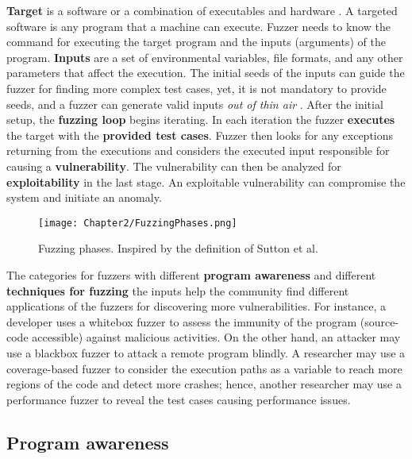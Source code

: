\textbf{Target} is a software or a combination of executables and hardware \cite{song2019periscope}. A targeted software is any program that a machine can execute. 
Fuzzer needs to know the command for executing the target program and the inputs (arguments) of the program. \textbf{Inputs} are a set of environmental variables, file formats, and any other parameters that affect the execution. The initial seeds of the inputs can guide the fuzzer for finding more complex test cases, yet, it is not mandatory to provide seeds, and a fuzzer can generate valid inputs \textit{out of thin air} \cite{out_of_thin_air}. After the initial setup, the \textbf{fuzzing loop} begins iterating. In each iteration the fuzzer \textbf{executes} the target with the \textbf{provided test cases}. Fuzzer then looks for any exceptions returning from the executions and considers the executed input responsible for causing a \textbf{vulnerability}. The vulnerability can then be analyzed for \textbf{exploitability} in the last stage. An exploitable vulnerability can compromise the system and initiate an anomaly.

\begin{figure}[!b]
  \texttt{[image: Chapter2/FuzzingPhases.png]}
  \centering
  \caption{Fuzzing phases. Inspired by the definition of Sutton et al. \cite{sutton2007fuzzing}}
  \label{fig:fuzz_phases}
\end{figure}

The categories for fuzzers with different \textbf{program awareness} and different \textbf{techniques for fuzzing} the inputs help the community find different applications of the fuzzers for discovering more vulnerabilities. For instance, a developer uses a whitebox fuzzer to assess the immunity of the program (source-code accessible) against malicious activities. On the other hand, an attacker may use a blackbox fuzzer to attack a remote program blindly. A researcher may use a coverage-based fuzzer to consider the execution paths as a variable to reach more regions of the code and detect more crashes; hence, another researcher may use a performance fuzzer to reveal the test cases causing performance issues. 

\subsection{Program awareness}


